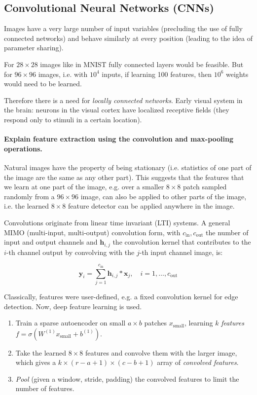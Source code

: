 \newpage
\subsection{Convolutional Neural Networks (CNNs)}

Images have
a very large number of input variables (precluding the use of fully connected networks)
and behave similarly at every position (leading to the idea of parameter sharing).

For $28 \times 28$ images like in MNIST fully connected layers would be feasible.
But for $96 \times 96$ images, i.e. with $10^4$ inputs, if learning 100 features, then $10^6$ weights would need to be learned.

Therefore there is a need for \textit{locally connected networks}.
Early visual system in the brain:
neurons in the visual cortex have localized receptive fields (they respond
only to stimuli in a certain location).

\paragraph{Explain feature extraction using the convolution and max-pooling operations.}

Natural images have the property of being stationary (i.e. statistics of
one part of the image are the same as any other part).
This suggests that the features that we learn at one part of the image,
e.g. over a smaller $8 \times 8$ patch sampled randomly from a $96 \times 96$ image,
can also be applied to other parts of the image,
i.e. the learned $8 \times 8$ feature detector can be applied anywhere in the image.

Convolutions originate from linear time invariant (LTI) systems.
A general MIMO (multi-input, multi-output) convolution form,
with $c_\text{in}, c_\text{out}$ the number of input and output channels
and $\bm{h}_{i,j}$ the convolution kernel that contributes to the $i$-th channel output by convolving with the $j$-th input channel image,
is:

$$\bm{y}_i = \sum_{j=1}^{c_\text{in}}{ \bm{h}_{i,j} * \bm{x}_j }, \quad i = 1, \dots, c_\text{out}$$

Classically, features were user-defined, e.g. a fixed convolution kernel for edge detection.
Now, deep feature learning is used.

\begin{enumerate}
    \item Train a sparse autoencoder on small $a \times b$ patches $x_\text{small}$,
    learning $k$ \textit{features} $f = \sigma(W^{(1)} x_\text{small} + b^{(1)})$.
    \item Take the learned $8 \times 8$ features and convolve them with the larger image,
    which gives a $k \times (r - a + 1) \times (c - b + 1)$ array of \textit{convolved features}.
    \item \textit{Pool} (given a window, stride, padding) the convolved features to limit the number of features.
\end{enumerate}

